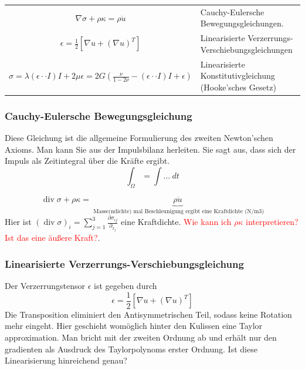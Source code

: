 	\begin{table}[H]
			\flushleft
			\begin{tabularx}{\textwidth}{@{}cX@{}}
				$ \nabla \sigma + \rho \kappa = \rho \ddot{u}$ & Cauchy-Eulersche Bewegungsgleichungen. \\
				$ \epsilon = \frac{1}{2} [\nabla u + (\nabla u)^T]$ & Linearisierte Verzerrungs-Verschiebungsgleichungen \\
				$ \sigma = \lambda( \epsilon \cdot \cdot I) I + 2 \mu \epsilon = 2G ( \frac{\nu}{1-2 \nu} -(\epsilon \cdot \cdot I) I + \epsilon)$ & Linearisierte Konstitutivgleichung (Hooke'sches Gesetz)
			\end{tabularx}
	\end{table}
\subsubsection{Cauchy-Eulersche Bewegungsgleichung}
Diese Gleichung ist die allgemeine Formulierung des zweiten Newton'schen Axioms. Man kann Sie aus der Impulsbilanz herleiten. Sie sagt aus, dass sich der Impuls als Zeitintegral über die Kräfte ergibt.
\begin{equation*}
	\int_{\Omega} = \int \dots \ dt
\end{equation*}




\begin{equation*}
	\operatorname{div}  \sigma + \rho \kappa = \underbrace{\rho \ddot{u}}_{\text{ Masse(ndichte) mal Beschleunigung ergibt eine Kraftdichte (N/m3)}}
\end{equation*}
Hier ist $(\operatorname{div}  \sigma)_i= \sum_{j=1}^{3}  \frac{\partial \sigma_{ij}}{\partial_{x_j}}$ eine Kraftdichte. \textcolor{red}{Wie kann ich $\rho \kappa$ interpretieren? Ist das eine äußere Kraft?}.



\subsubsection*{Linearisierte Verzerrungs-Verschiebungsgleichung}
	Der Verzerrungstensor $\epsilon$ ist gegeben durch
	\begin{equation*}
		\epsilon = \frac{1}{2}[\nabla u + (\nabla u)^T]
	\end{equation*}
	Die Transposition eliminiert den Antisymmetrischen Teil, sodass keine Rotation mehr eingeht. Hier geschieht womöglich hinter den Kulissen eine Taylor approximation. Man bricht mit der zweiten Ordnung ab und erhält nur den gradienten als Ausdruck des Taylorpolynoms erster Ordnung. Ist diese Linearisierung hinreichend genau? 

